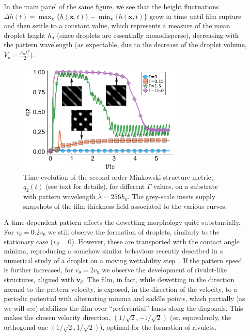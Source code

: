 In the main panel of the same figure, we see that the height fluctuations $\Delta h(t) = \max_{\mathbf{x}}\{h(\mathbf{x},t)\}-\min_{\mathbf{x}}\{h(\mathbf{x},t)\}$
grow in time until film rupture and then settle to a constant value, which represents a measure of the mean droplet height $h_d$ (since
droplets are essentially monodisperse), decreasing with the pattern wavelength (as expectable, due to the decrease of the droplet volume,
$V_d = \frac{h_0 \lambda^2}{2}$).\\
\begin{figure}
    \centering
    \includegraphics[width=0.75\textwidth]{graphics/Figure_4.pdf}
    \caption{Time evolution of the second order Minkowski structure metric, $q_2(t)$ (see text for details), for different $\Gamma$ values, on a substrate with pattern wavelength $\lambda=256 h_0$.
    The grey-scale insets supply snapshots of the film thickness field associated to the various curves.
    }
    \label{fig:msm_q2}
\end{figure}
A time-dependent pattern affects the dewetting morphology quite substantially.
For $v_{\theta} = 0.2 v_0$ we still observe the formation of droplets, similarly to the stationary case ($v_{\theta} = 0$). However, these are transported with the contact angle minima, reproducing a somehow similar behaviour recently described in a numerical study of a droplet on a moving wettability step~\cite{D0SM02082F}.
If the pattern speed is further increased, for $v_{\theta} = 2 v_0$ we observe the development of rivulet-like structures, aligned with $\mathbf{v}_{\theta}$. 
The film, in fact, while dewetting in the direction normal to the pattern velocity, is exposed, in the direction of the velocity, to a periodic potential with alternating minima and saddle points, which partially (as we will see) stabilizes the film over ``preferential'' lanes along the diagonals. 
This makes the chosen velocity direction, $(1/\sqrt{2},-1/\sqrt{2})$ (or, equivalently, the orthogonal one $(1/\sqrt{2},1/\sqrt{2})$), optimal for the formation of rivulets. 

